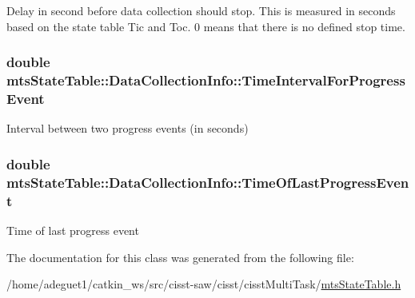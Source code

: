 Delay in second before data collection should stop. This is measured in seconds based on the state table Tic and Toc. 0 means that there is no defined stop time. \hypertarget{classmts_state_table_1_1_data_collection_info_aa82de94c4fe55892c5be18052e5e0c0b}{
\subsubsection[{Time\-Interval\-For\-Progress\-Event}]{\setlength{\rightskip}{0pt plus 5cm}double mts\-State\-Table\-::\-Data\-Collection\-Info\-::\-Time\-Interval\-For\-Progress\-Event}}\label{classmts_state_table_1_1_data_collection_info_aa82de94c4fe55892c5be18052e5e0c0b}
Interval between two progress events (in seconds) \hypertarget{classmts_state_table_1_1_data_collection_info_a160735e608b58846356e7fc6be792832}{
\subsubsection[{Time\-Of\-Last\-Progress\-Event}]{\setlength{\rightskip}{0pt plus 5cm}double mts\-State\-Table\-::\-Data\-Collection\-Info\-::\-Time\-Of\-Last\-Progress\-Event}}\label{classmts_state_table_1_1_data_collection_info_a160735e608b58846356e7fc6be792832}
Time of last progress event 

The documentation for this class was generated from the following file\-:\begin{DoxyCompactItemize}
\item 
/home/adeguet1/catkin\-\_\-ws/src/cisst-\/saw/cisst/cisst\-Multi\-Task/\hyperlink{mts_state_table_8h}{mts\-State\-Table.\-h}\end{DoxyCompactItemize}

